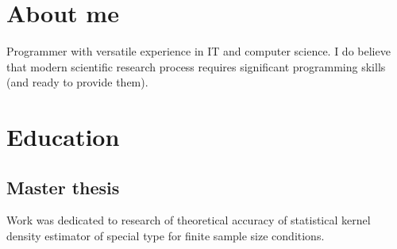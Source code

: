 \documentclass[12pt,a4paper,sans]{moderncv}
\begin{document}
\makecvtitle

\section{About me}
Programmer with versatile experience in IT and computer science.
I do believe that modern scientific research process requires significant programming skills (and ready to provide them).

\section{Education}

\subsection{Master thesis}
Work was dedicated to research of theoretical accuracy of statistical kernel density estimator of special type for finite sample size conditions.
\end{document}
